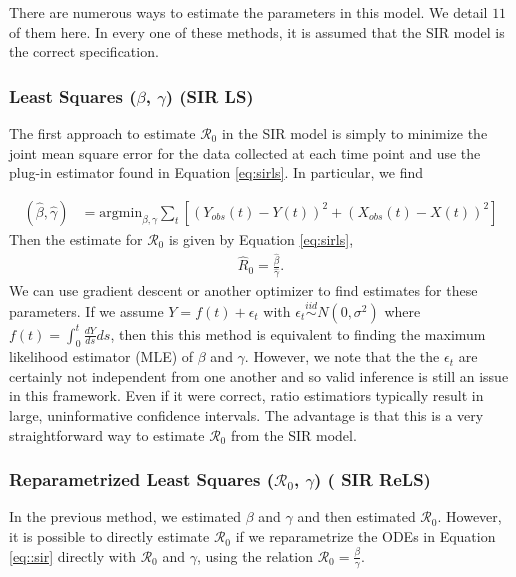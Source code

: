 \documentclass[12pt]{article}
\newcommand{\xxsir}{\ensuremath{11}} %
\newcommand{\rr}{\ensuremath{\mathcal{R}_0}}
\begin{document}
There are numerous ways to estimate the parameters in this model.  We detail $\xxsir$ of them here.  In every one of these methods, it is assumed that the SIR model is the correct specification.

\subsubsection{Least Squares ($\beta$, $\gamma$) (SIR LS)}\label{least-squares-beta-gamma}
The first approach to estimate $\rr$ in the SIR model is simply to minimize the joint mean square error for the data collected at each time point and use the plug-in estimator found in Equation \ref{eq:sirls}.  In particular, we find

\begin{align*}
(\hat{\beta}, \hat{\gamma} )&=\text{argmin}_{\beta, \gamma} \sum_{t} \left [ \left (Y_{obs}(t) - Y(t)\right )^2 + \left ( X_{obs}(t) - X(t) \right )^2 \right ]
\end{align*}
Then  the estimate for $\rr$ is given by Equation \ref{eq:sirls},
\begin{align}\label{eq:sirls}
  \hat{R}_0= \frac{\hat{\beta}}{\hat{\gamma}}.
  \end{align}
We can use gradient descent or another optimizer to find estimates for these parameters.  If we assume $Y= f(t) + \epsilon_t$ with $\epsilon_t \overset{iid}{\sim} N(0, \sigma^2)$ where $f(t) = \int_0^t \frac{dY}{ds} ds$, then this this method is equivalent to finding the maximum likelihood estimator (MLE) of $\beta$ and $\gamma$.  However, we note that the the $\epsilon_t$ are certainly not independent from one another and so valid inference is still an issue in this framework.  Even if it were correct, ratio estimatiors typically result in large, uninformative confidence intervals.   The advantage is that this is a very straightforward way to estimate $\rr$ from the SIR model.

\subsubsection{Reparametrized Least Squares ($\rr$, $\gamma$) ( SIR ReLS)}\label{reparametrized-least-squares-rux5f0-gamma}

In the previous method, we estimated $\beta$ and $\gamma$ and then estimated $\rr$.  However, it is possible to directly estimate $\rr$ if we reparametrize the ODEs in Equation \eqref{eq::sir} directly with \(\rr\) and \(\gamma\), using the relation $\rr = \frac{\beta}{\gamma}$.
\end{document}
